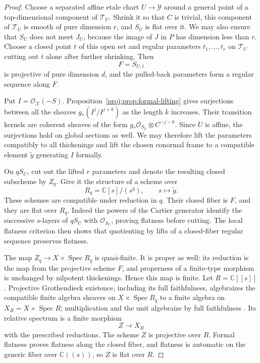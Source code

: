 \documentclass[11pt,letterpaper]{article}
\theoremstyle{definition}
\theoremstyle{remark}
\begin{document}
\begin{proof}
Choose a separated affine etale chart $U\to\mathcal Y$
around a general point of a top-dimensional component of
$\mathcal T_U$.  Shrink it so that $C$ is trivial, this
component of $\mathcal T_U$ is smooth of pure dimension $r$,
and $S_U$ is flat over it.  We may also ensure that $S_U$
does not meet $J_U$, because the image of $J$ in $P$ has
dimension less than $r$.  Choose a closed point $t$ of this
open set and regular parameters $t_1,\ldots,t_r$ on
$\mathcal T_U$ cutting out $t$ alone after further shrinking.
Then
\[
 F=S_{U,t}
\]
is projective of pure dimension $d$, and the pulled-back
parameters form a regular sequence along $F$.

Put $I=\mathcal{O}_{\mathcal X}(-S)$.  Proposition~\ref{proj:prop:formal-lifting}
gives surjections between all the sheaves
$g_*(I^j/I^{j+k})$ as the length $k$ increases.
Their transition kernels are coherent sheaves of the form
$g_*\mathcal{O}_{S_U}\otimes C^{-j-k}$.  Since $U$ is affine, the
surjections hold on global sections as well.  We may
therefore lift the parameters compatibly to all
thickenings and lift the chosen conormal frame to a
compatible element $\widetilde y$ generating $I$ formally.

On $qS_U$, cut out the lifted $r$ parameters and denote the
resulting closed subscheme by $Z_q$.  Give it the structure
of a scheme over
\[
 R_q=\mathbb{C}[s]/(s^q),\qquad s\longmapsto\widetilde y.
\]
These schemes are compatible under reduction in $q$.
Their closed fiber is $F$, and they are flat over $R_q$.
Indeed the powers of the Cartier generator identify the
successive $s$-layers of $qS_U$ with $\mathcal{O}_{S_U}$, proving
flatness before cutting.  The local flatness criterion then
shows that quotienting by lifts of a closed-fiber regular
sequence preserves flatness.

The map
$Z_q\to X\times\operatorname{Spec} R_q$ is quasi-finite.
It is proper as well: its reduction is the map from the
projective scheme $F$, and properness of a finite-type
morphism is unchanged by nilpotent thickenings.  Hence
this map is finite.  Let $R=\mathbb{C}[[s]]$.  Projective
Grothendieck existence, including its full faithfulness,
algebraizes the compatible finite algebra sheaves on
$X\times\operatorname{Spec} R_q$ to a finite algebra on
$X_R=X\times\operatorname{Spec} R$; multiplication and the unit
algebraize by full faithfulness
\cite[Lemmas~30.24.1 and~30.24.3]{Proj-StacksExistence}.
Its relative spectrum is a finite morphism
\[
 Z\longrightarrow X_R
\]
with the prescribed reductions.  The scheme $Z$ is
projective over $R$.  Formal flatness proves flatness
along the closed fiber, and flatness is automatic on the
generic fiber over $\mathbb{C}((s))$, so $Z$ is flat over $R$.


\end{proof}
\end{document}
